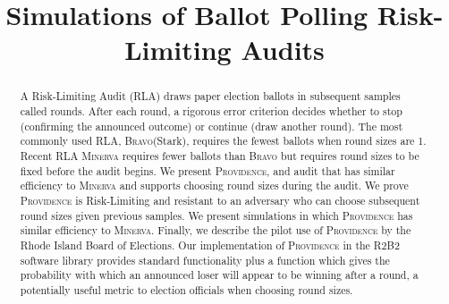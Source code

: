 \documentclass[runningheads]{llncs}
\newcommand{\Minerva}{\textsc{Minerva}\xspace}
\newcommand{\Providence}{\textsc{Providence}\xspace}
\newcommand{\BRAVO}{\textsc{Bravo}\xspace}
\begin{document}
\lstset{language=Python}
%
\title{Simulations of Ballot Polling Risk-Limiting Audits}
%
%
%
%
%

\maketitle              %
%
\begin{abstract}
A Risk-Limiting Audit (RLA) draws paper election ballots in subsequent samples called rounds. 
After each round, a rigorous error criterion decides whether to stop (confirming the announced outcome) or continue (draw another round).
The most commonly used RLA, \BRAVO (Stark), requires the fewest ballots when round sizes are 1. 
Recent RLA \Minerva requires fewer ballots than \BRAVO but requires round sizes to be fixed before the audit begins.
We present \Providence, and audit that has similar efficiency to \Minerva and supports choosing round sizes during the audit.
We prove \Providence is Risk-Limiting and resistant to an adversary who can choose subsequent round sizes given previous samples.
We present simulations in which \Providence has similar efficiency to \Minerva.
Finally, we describe the pilot use of \Providence by the Rhode Island Board of Elections.
Our implementation of \Providence in the R2B2 software library provides standard functionality 
plus a function which gives the probability with which an announced loser will appear to be winning
after a round, a potentially useful metric to election officials when choosing round sizes.
\end{abstract}
%
%
\end{document}
